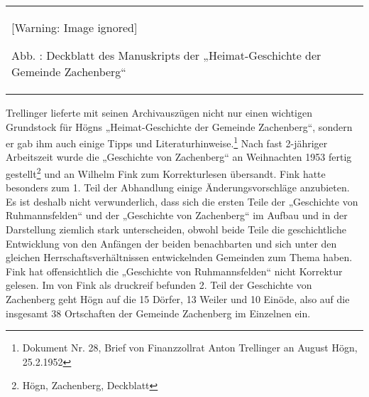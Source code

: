 \documentclass[a4paper]{article}
\newcounter{Abb}
\renewcommand\theAbb{\arabic{Abb}}
\begin{document}
\begin{center}
\begin{minipage}{5.378cm}
\begin{flushleft}
\tablefirsthead{}
\tablehead{}
\tabletail{}
\tablelasttail{}
\begin{supertabular}{m{5.178cm}}
  [Warning: Image ignored] %
 
Abb. \stepcounter{Abb}{\theAbb}: Deckblatt des Manuskripts der
„Heimat-Geschichte der Gemeinde Zachenberg“\\
\end{supertabular}
\end{flushleft}
\end{minipage}
\end{center}
Trellinger lieferte mit seinen Archivauszügen nicht nur einen wichtigen
Grundstock für Högns „Heimat-Geschichte der Gemeinde Zachenberg“,
sondern er gab ihm auch einige Tipps und Literaturhinweise.\footnote{
Dokument Nr. 28, Brief von Finanzzollrat Anton Trellinger an August
Högn, 25.2.1952} Nach fast 2-jähriger Arbeitszeit wurde die „Geschichte
von Zachenberg“ an Weihnachten 1953 fertig gestellt\footnote{ Högn,
Zachenberg, Deckblatt} und an Wilhelm Fink zum Korrekturlesen
übersandt. Fink hatte besonders zum 1. Teil der Abhandlung einige
Änderungsvorschläge anzubieten. Es ist deshalb nicht verwunderlich,
dass sich die ersten Teile der „Geschichte von Ruhmannsfelden“ und der
„Geschichte von Zachenberg“ im Aufbau und in der Darstellung ziemlich
stark unterscheiden, obwohl beide Teile die geschichtliche Entwicklung
von den Anfängen der beiden benachbarten und sich unter den gleichen
Herrschaftsverhältnissen entwickelnden Gemeinden zum Thema haben. Fink
hat offensichtlich die „Geschichte von Ruhmannsfelden“ nicht Korrektur
gelesen. Im von Fink als druckreif befunden 2. Teil der Geschichte von
Zachenberg geht Högn auf die 15 Dörfer, 13 Weiler und 10 Einöde, also
auf die insgesamt 38 Ortschaften der Gemeinde Zachenberg im Einzelnen
ein. 
\end{document}
